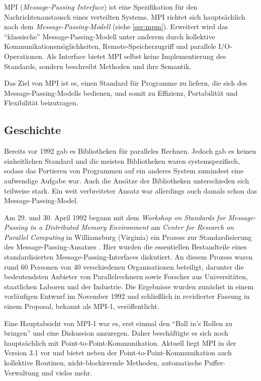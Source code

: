     MPI (\textit{Message-Passing Interface}) ist eine Spezifikation für den Nachrichtenaustausch eines verteilten Systems. MPI richtet sich hauptsächlich nach dem 
    \textit{Message-Passing-Modell} (siehe \autoref{sec:mpm}).
    Erweitert wird das ``klassische'' Message-Passing-Modell unter anderem durch kollektive Kommunikationsmöglichkeiten, Remote-Speicherzugriff und parallele I/O-Operationen.
    Als Interface bietet MPI selbst keine Implementierung des Standards, sondern beschreibt Methoden und ihre Semantik.
    
    Das Ziel von MPI ist es, einen Standard für Programme zu liefern, die sich des Message-Passing-Modells bedienen, und somit zu Effizienz, Portabilität und Flexibilität
    beizutragen. \citep{mpiv31}
    
    \subsection{Geschichte}
      Bereits vor 1992 gab es Bibliotheken für paralleles Rechnen. Jedoch gab es keinen einheitlichen Standard und die meisten Bibliotheken waren systemspezifisch,
      sodass das Portieren von Programmen auf ein anderes System zumindest eine aufwendige Aufgabe war. Auch die Ansätze der Bibliotheken unterschieden sich teilweise
      stark. Ein weit verbreiteter Ansatz war allerdings auch damals schon das Message-Passing-Model. \citep{mpitut}
      
      Am 29. und 30. April 1992 begann mit dem \textit{Workshop on Standards for Message-Passing in a Distributed Memory Environment} am \textit{Center for Research on Parallel 
      Computing} in Williamsburg (Virginia) ein Prozess zur Standardisierung des Message-Passing-Ansatzes \citep{workshop}. Hier wurden die essentiellen Bestandteile eines 
      standardisierten Message-Passing-Interfaces diskutiert. An diesem Prozess waren rund 60 Personen von 40 verschiedenen Organisationen beteiligt, darunter die bedeutendsten
      Anbieter von Parallelrechnern sowie Forscher aus Universitäten, staatlichen Laboren und der Industrie. Die Ergebnisse wurden zunächst in einem vorläufigen Entwurf im
      November 1992 und schließlich in revidierter Fassung in einem Proposal, bekannt als MPI-1, veröffentlicht. \citep{mpi1}
      
      Eine Hauptabsicht von MPI-1 war es, erst einmal den ``Ball in's Rollen zu bringen'' und eine Diskussion anzuregen. Daher beschäftigte es sich noch hauptsächlich mit Point-to-Point-Kommunikation.
      Aktuell liegt MPI in der Version 3.1 vor und bietet neben der Point-to-Point-Kommunikation auch kollektive Routinen, nicht-blockierende Methoden, automatische Puffer-Verwaltung und vieles mehr.
      \citep{mpiv31}
      
